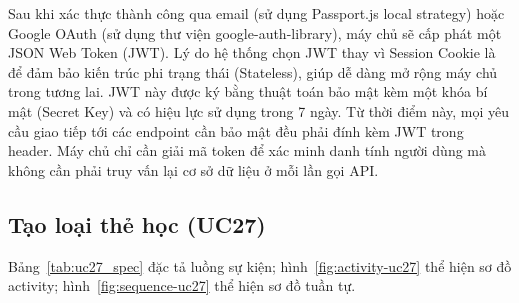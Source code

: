 \begin{sloppypar}
Sau khi xác thực thành công qua email (sử dụng Passport.js local strategy) hoặc Google OAuth (sử dụng thư viện google-auth-library), máy chủ sẽ cấp phát một JSON Web Token (JWT). Lý do hệ thống chọn JWT thay vì Session Cookie là để đảm bảo kiến trúc phi trạng thái (Stateless), giúp dễ dàng mở rộng máy chủ trong tương lai. JWT này được ký bằng thuật toán bảo mật kèm một khóa bí mật (Secret Key) và có hiệu lực sử dụng trong 7 ngày. Từ thời điểm này, mọi yêu cầu giao tiếp tới các endpoint cần bảo mật đều phải đính kèm JWT trong header. Máy chủ chỉ cần giải mã token để xác minh danh tính người dùng mà không cần phải truy vấn lại cơ sở dữ liệu ở mỗi lần gọi API.
\end{sloppypar}

\subsection{Tạo loại thẻ học (UC27)}
Bảng~\ref{tab:uc27_spec} đặc tả luồng sự kiện; hình~\ref{fig:activity-uc27} thể hiện sơ đồ activity; hình~\ref{fig:sequence-uc27} thể hiện sơ đồ tuần tự.
